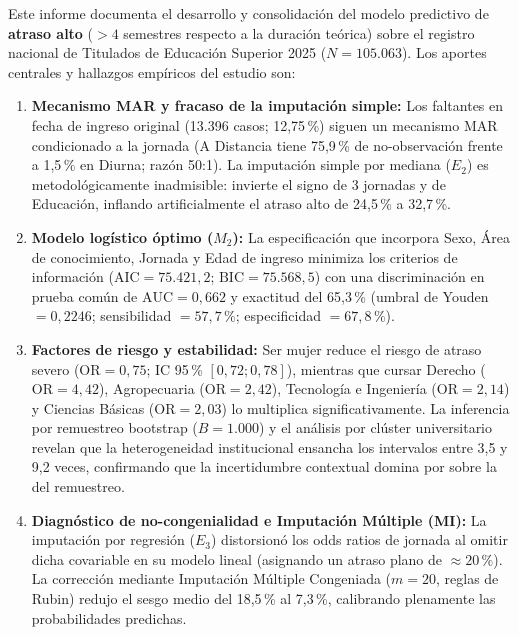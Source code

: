 \documentclass[11pt,a4paper]{article}
\begin{document}
Este informe documenta el desarrollo y consolidación del modelo predictivo de \textbf{atraso alto} ($>4$ semestres respecto a la duración teórica) sobre el registro nacional de Titulados de Educación Superior 2025 ($N = 105.063$). Los aportes centrales y hallazgos empíricos del estudio son:
\begin{enumerate}[leftmargin=*]
\item \textbf{Mecanismo MAR y fracaso de la imputación simple:} Los faltantes en fecha de ingreso original (13.396 casos; 12,75\,\%) siguen un mecanismo MAR condicionado a la jornada (A Distancia tiene 75,9\,\% de no-observación frente a 1,5\,\% en Diurna; razón 50:1). La imputación simple por mediana ($E_2$) es metodológicamente inadmisible: invierte el signo de 3 jornadas y de Educación, inflando artificialmente el atraso alto de 24,5\,\% a 32,7\,\%.
\item \textbf{Modelo logístico óptimo ($M_2$):} La especificación que incorpora Sexo, Área de conocimiento, Jornada y Edad de ingreso minimiza los criterios de información ($\text{AIC} = 75.421,2$; $\text{BIC} = 75.568,5$) con una discriminación en prueba común de $\text{AUC} = 0,662$ y exactitud del 65,3\,\% (umbral de Youden $= 0,2246$; sensibilidad $= 57,7\,\%$; especificidad $= 67,8\,\%$).
\item \textbf{Factores de riesgo y estabilidad:} Ser mujer reduce el riesgo de atraso severo ($\text{OR} = 0,75$; IC 95\,\% $[0,72; 0,78]$), mientras que cursar Derecho ($\text{OR} = 4,42$), Agropecuaria ($\text{OR} = 2,42$), Tecnología e Ingeniería ($\text{OR} = 2,14$) y Ciencias Básicas ($\text{OR} = 2,03$) lo multiplica significativamente. La inferencia por remuestreo bootstrap ($B=1.000$) y el análisis por clúster universitario revelan que la heterogeneidad institucional ensancha los intervalos entre 3,5 y 9,2 veces, confirmando que la incertidumbre contextual domina por sobre la del remuestreo.
\item \textbf{Diagnóstico de no-congenialidad e Imputación Múltiple (MI):} La imputación por regresión ($E_3$) distorsionó los odds ratios de jornada al omitir dicha covariable en su modelo lineal (asignando un atraso plano de $\approx 20\,\%$). La corrección mediante Imputación Múltiple Congeniada ($m=20$, reglas de Rubin) redujo el sesgo medio del 18,5\,\% al 7,3\,\%, calibrando plenamente las probabilidades predichas.
\end{enumerate}

\newpage

\end{document}
